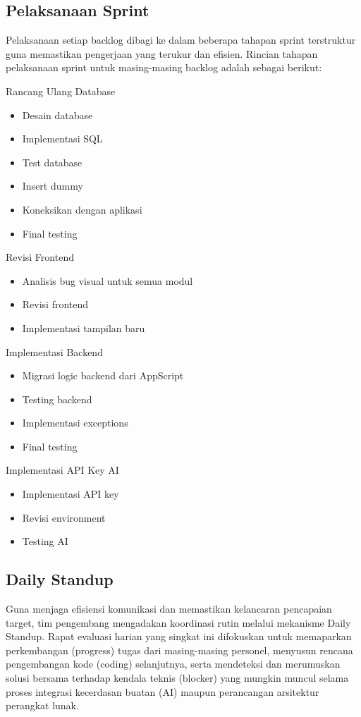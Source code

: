 \subsection{Pelaksanaan Sprint}
Pelaksanaan setiap backlog dibagi ke dalam beberapa tahapan sprint terstruktur guna memastikan pengerjaan yang terukur dan efisien. Rincian tahapan pelaksanaan sprint untuk masing-masing backlog adalah sebagai berikut:

\noindent Rancang Ulang Database
\begin{itemize}
    \item Desain database
    \item Implementasi SQL
    \item Test database
    \item Insert dummy
    \item Koneksikan dengan aplikasi
    \item Final testing
\end{itemize}

\noindent Revisi Frontend
\begin{itemize}
    \item Analisis bug visual untuk semua modul
    \item Revisi frontend
    \item Implementasi tampilan baru
\end{itemize}

\noindent Implementasi Backend
\begin{itemize}
    \item Migrasi logic backend dari AppScript
    \item Testing backend
    \item Implementasi exceptions
    \item Final testing
\end{itemize}

\noindent Implementasi API Key AI
\begin{itemize}
    \item Implementasi API key
    \item Revisi environment
    \item Testing AI
\end{itemize}

\subsection{Daily Standup}
Guna menjaga efisiensi komunikasi dan memastikan kelancaran pencapaian target, tim pengembang mengadakan koordinasi rutin melalui mekanisme Daily Standup. Rapat evaluasi harian yang singkat ini difokuskan untuk memaparkan perkembangan (progress) tugas dari masing-masing personel, menyusun rencana pengembangan kode (coding) selanjutnya, serta mendeteksi dan merumuskan solusi bersama terhadap kendala teknis (blocker) yang mungkin muncul selama proses integrasi kecerdasan buatan (AI) maupun perancangan arsitektur perangkat lunak.

